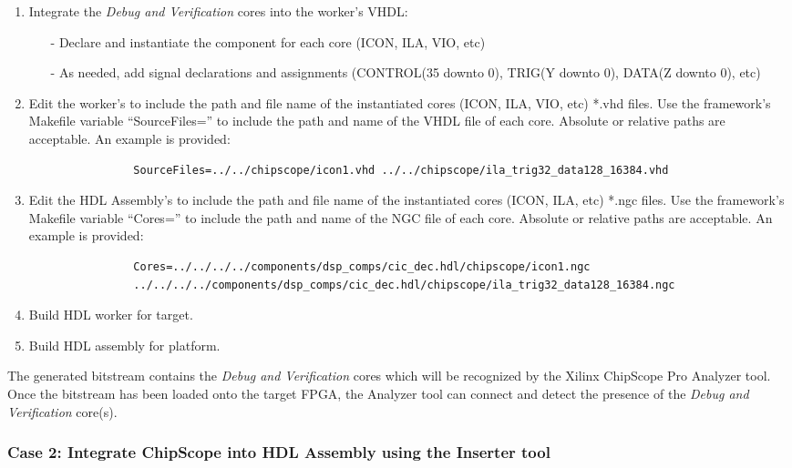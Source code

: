 \begin{flushleft}
		\begin{enumerate}
			\item Integrate the \textit{Debug and Verification} cores into the worker's VHDL:
			\begin{itemize}
			\item[-] Declare and instantiate the component for each core (ICON, ILA, VIO, etc)
				\item[-] As needed, add signal declarations and assignments (CONTROL(35 downto 0), TRIG(Y downto 0), DATA(Z downto 0), etc)
			\end{itemize}
				
			\item Edit the worker's  to include the path and file name of the
			instantiated cores (ICON, ILA, VIO, etc) *.vhd files. Use the framework's Makefile
			variable ``SourceFiles='' to include the path and name of the VHDL file of each core.
			Absolute or relative paths are acceptable. An example is provided:
			\small\begin{verbatim}
				SourceFiles=../../chipscope/icon1.vhd ../../chipscope/ila_trig32_data128_16384.vhd
			\end{verbatim}
		 	\item Edit the HDL Assembly's  to include the path and file name of
		 	the	instantiated cores (ICON, ILA, etc) *.ngc files. Use the framework's
		 	Makefile variable ``Cores='' to include the path and name of the NGC file of each
		 	core. Absolute or relative paths are acceptable. An example is provided:
		 	\small\begin{verbatim}
		 		Cores=../../../../components/dsp_comps/cic_dec.hdl/chipscope/icon1.ngc
		 		../../../../components/dsp_comps/cic_dec.hdl/chipscope/ila_trig32_data128_16384.ngc
		 	\end{verbatim}
		 	\item Build HDL worker for target.
			\item Build HDL assembly for platform.
		\end{enumerate}

		The generated bitstream contains the \textit{Debug and Verification} cores which will be recognized by the Xilinx ChipScope Pro Analyzer tool. Once the bitstream has been loaded onto the target FPGA, the Analyzer tool can connect and detect the presence of the \textit{Debug and Verification} core(s).

	\newpage

	\subsubsection{Case 2: Integrate ChipScope into HDL Assembly using the Inserter tool}


\end{flushleft}
